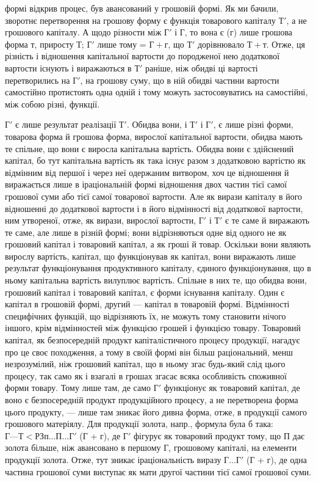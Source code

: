 \parcont{}  %
формі відкрив процес, був авансований у грошовій формі. Як ми бачили,
зворотнє перетворення на грошову форму є функція товарового капіталу
$Т'$, а не грошового капіталу. А щодо різности між $Г'$ і Г, то вона є (г)
лише грошова форма т, приросту Т; $Г'$ лише тому = $Г + г$, що $Т'$
дорівнювало $Т + т$. Отже, ця різність і відношення капітальної вартости
до породженої нею додаткової вартости існують і виражаються в $Т'$ раніше,
ніж обидві ці вартості перетворились на $Г'$, на грошову суму, що в
ній обидві частини вартости самостійно протистоять одна одній і тому
можуть застосовуватись на самостійні, між собою різні, функції.

$Г'$ є лише результат реалізації $Т'$. Обидва вони, і $Т'$ і $Г'$, є лише різні
форми, товарова форма й грошова форма, вирослої капітальної вартости,
обидва мають те спільне, що вони є виросла капітальна вартість. Обидва
вони є здійснений капітал, бо тут капітальна вартість як така існує разом
з додатковою вартістю як відмінним від першої і через неї одержаним
витвором, хоч це відношення й виражається лише в іраціональній
формі відношення двох частин тієї самої грошової суми або тієї самої
товарової вартости. Але як вирази капіталу в його відношенні до
додаткової вартости і в його відмінності від додаткової вартости, ним
утвореної, отже, як вирази, вирослої вартости, $Г'$ і $Т'$ є те саме й виражають
те саме, але лише в різній формі; вони відрізняються одне від одного
не як грошовий капітал і товаровий капітал, а як гроші й товар.
Оскільки вони являють вирослу вартість, капітал, що функціонував як
капітал, вони виражають лише результат функціонування продуктивного
капіталу, єдиного функціонування, що в ньому капітальна вартість вилуплює
вартість. Спільне в них те, що обидва вони, грошовий капітал і
товаровий капітал, є форми існування капіталу. Один є капітал в грошовій
формі, другий — капітал в товаровій формі. Відмінності специфічних
функцій, що відрізняють їх, не можуть тому становити нічого
іншого, крім відмінностей між функцією грошей і функцією товару. Товаровий
капітал, як безпосередній продукт капіталістичного процесу продукції,
нагадує про це своє походження, а тому в своїй формі
він більш раціональний, менш незрозумілий, ніж грошовий капітал,
що в ньому згас будь-який слід цього процесу, так само як і
взагалі в грошах згасає всяка особливість споживної форми товару. Тому
лише там, де само $Г'$ функціонує як товаровий капітал, де воно
є безпосередній продукт продукційного процесу, а не перетворена
форма цього продукту, — лише там зникає його дивна форма, отже, в
продукції самого грошового матеріялу. Для продукції золота, напр., формула була б така: $Г — Т < Р
Зп...  П... Г'$ (Г + г), де $Г'$ фігурує як товаровий
продукт тому, що П дає золота більше, ніж авансовано в
першому Г, грошовому капіталі, на елементи продукції золота. Отже,
тут зникає іраціональність виразу $Г... Г'$ (Г + г), де одна частина
грошової суми виступає як мати другої частини тієї самої грошової
суми.
